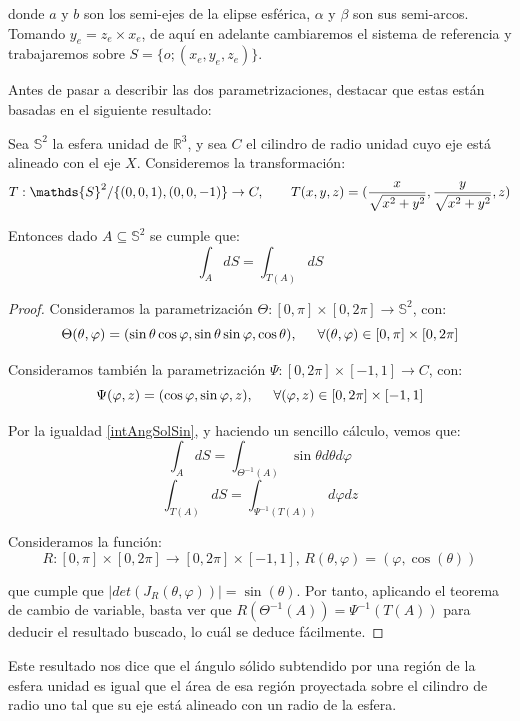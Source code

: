 donde $a$ y $b$ son los semi-ejes de la elipse esférica, $\alpha$ y $\beta$ son sus semi-arcos. Tomando $y_e=z_e\times x_e$, de aquí en adelante cambiaremos el sistema de referencia y trabajaremos sobre $S=\{o;(x_e, y_e, z_e)\}$.

Antes de pasar a describir las dos parametrizaciones, destacar que estas están basadas en el siguiente resultado:

\begin{proposicion}
Sea $\mathds{S}^2$ la esfera unidad de $\mathds{R}^3$, y sea $C$ el cilindro de radio unidad cuyo eje está alineado con el eje $X$. Consideremos la transformación:
$$T:\mathds{S}^2/\{(0,0,1),(0,0,-1)\}\rightarrow C, \hspace{0.7cm} T(x,y,z) = (\frac{x}{\sqrt{x^2+y^2}}, \frac{y}{\sqrt{x^2+y^2}}, z)$$

Entonces dado $A\subseteq\mathds{S}^2$ se cumple que:
$$\int_A dS = \int_{T(A)} dS$$
\end{proposicion}
\begin{proof}
Consideramos la parametrización $\Theta:[0,\pi ]\times [0,2\pi ]\rightarrow \mathds{S}^2$, con:
$$\Theta(\theta ,\varphi ) = ( \sin \theta \cos \varphi,  \sin \theta \sin \varphi , \cos \theta),\hspace{0.5cm}  \forall (\theta , \varphi)\in [0,\pi ]\times [0,2\pi ]$$

Consideramos también la parametrización $\Psi:[0,2\pi ]\times [-1,1]\rightarrow C$, con:
$$\Psi(\varphi , z ) = (\cos \varphi,  \sin \varphi , z),\hspace{0.5cm}  \forall (\varphi, z)\in [0,2\pi ]\times [-1,1]$$

Por la igualdad \ref{intAngSolSin}, y haciendo un sencillo cálculo, vemos que:
$$\int_A dS = \int_{\Theta^{-1}(A)} \sin\theta d\theta d\varphi$$
$$\int_{T(A)} dS = \int_{\Psi^{-1}(T(A))} d\varphi dz $$

Consideramos la función:
$$R:[0,\pi]\times [0,2\pi]\rightarrow [0,2\pi]\times [-1,1] \text{, } R(\theta,\varphi) = (\varphi, \cos(\theta))$$

que cumple que $|det(J_R(\theta,\varphi))| = \sin(\theta)$. Por tanto, aplicando el teorema de cambio de variable, basta ver que $R(\Theta^{-1}(A)) = \Psi^{-1}(T(A))$ para deducir el resultado buscado, lo cuál se deduce fácilmente.
\end{proof}

Este resultado nos dice que el ángulo sólido subtendido por una región de la esfera unidad es igual que el área de esa región proyectada sobre el cilindro de radio uno tal que su eje está alineado con un radio de la esfera.

